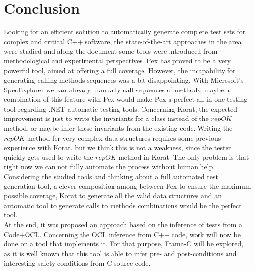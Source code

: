 \documentclass[a4paper,UKenglish]{oasics}
\begin{document}
\section{Conclusion}\label{Concl}
Looking for an efficient solution to automatically generate complete test sets for complex and critical C++ software,
the state-of-the-art approaches in the area were studied and along the document some tools were introduced from methodological and experimental perspectives.
Pex has proved to be a very powerful tool, aimed at offering a full coverage. However, the incapability for generating calling-methods sequences was a bit disappointing. 
With Microsoft's SpecExplorer we can already
manually call sequences of methods; maybe a combination of this feature with Pex would make Pex a perfect all-in-one testing tool regarding .NET automatic testing tools.
Concerning Korat, the expected improvement is just to write the invariants for a class instead of the $repOK$ method, or maybe infer these invariants 
from the existing code. Writing the $repOK$ method for very complex data structures requires some previous experience with Korat, but we think
this is not a weakness, since the tester quickly gets used to write the $repOK$ method in Korat. The only problem is that right now we can not fully automate the process
without human help.\\
\indent Considering the studied tools and thinking about a full automated test generation tool, a clever composition among between Pex to ensure the maximum possible coverage, 
Korat to generate all the valid data structures and an automatic tool to generate calls to methods combinations would be the perfect tool.\\

At the end, it was proposed  an approach based on the inference of tests from a Code+OCL.
\indent Concerning the OCL inference from C++ code, work will now be done on a tool that implements it.
For that purpose, Frama-C will be explored, as it is well known that this tool is able to infer pre- and post-conditions\cite{moy}
and interesting safety conditions from C source code.


\end{document}
